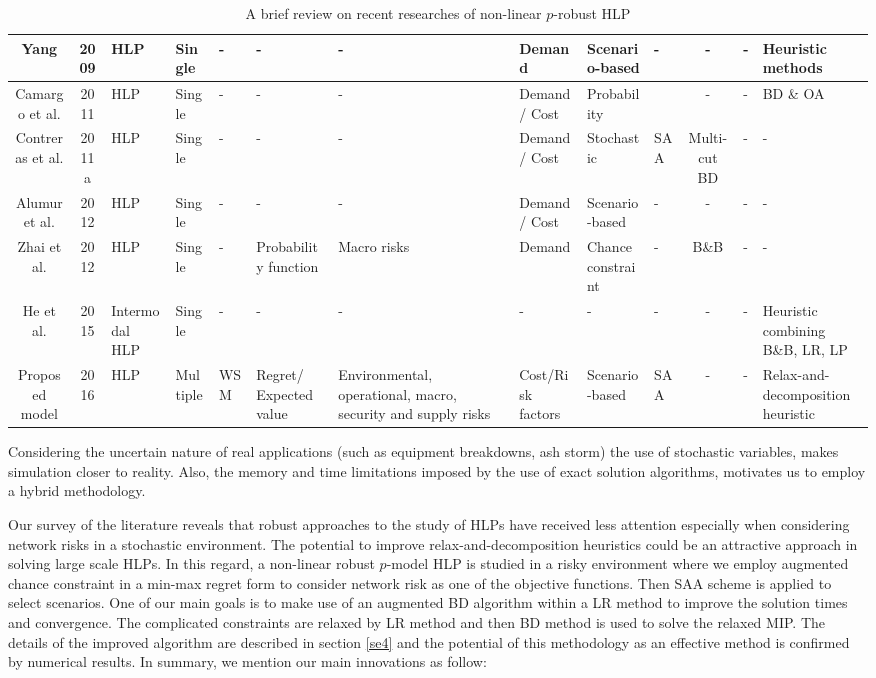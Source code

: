 \documentclass[review]{elsarticle}
\begin{document}
\begin{sidewaystable}
{\begin{tabular}{ccp{3cm}p{2cm}p{2cm}p{2cm}p{3cm}p{3cm}p{2cm}p{2cm}cp{2cm}p{2cm}}
Yang & 2009 & HLP & Single & - & - & - & Demand & Scenario-based & - & - & - & Heuristic methods \\ \hline 
Camargo et al. & 2011 & HLP & Single & - & - & - & Demand/ Cost & Probability &  & - & - & BD \& OA \\ \hline 
Contreras et al. & 2011a & HLP & Single & - & - & - & Demand/ Cost & Stochastic & SAA & Multi-cut BD & - & - \\ \hline 
Alumur et al. & 2012 & HLP & Single & - & - & - & Demand/ Cost & Scenario-based & - & - & - & - \\ \hline 
Zhai et al. & 2012 & HLP & Single & - & Probability function & Macro risks & Demand & Chance constraint & - & B\&B & - & - \\ \hline 
He et al. & 2015 & Intermodal HLP & Single & - & - & - & - & - & - & - & - & Heuristic combining B\&B, LR, LP \\ \hline 
Proposed model & 2016 & HLP & Multiple & WSM & Regret/ Expected value & Environmental, operational, macro, security and supply risks & Cost/Risk factors & Scenario-based & SAA & - & - & Relax-and-decomposition heuristic \\ \hline 
\end{tabular}}
\caption{A brief review on recent researches of non-linear $p$-robust HLP}\label{ta1}
\end{sidewaystable}

Considering the uncertain nature of real applications (such as equipment breakdowns, ash storm) the use of stochastic variables, makes simulation closer to reality. Also, the memory and time limitations imposed by the use of exact solution algorithms, motivates us to employ a hybrid methodology.

Our survey of the literature reveals that robust approaches to the study of HLPs have received less attention especially when considering network risks in a stochastic environment. The potential to improve relax-and-decomposition heuristics could be an attractive approach in solving large scale HLPs. In this regard, a non-linear robust $p$-model HLP is studied in a risky environment where we employ augmented chance constraint in a min-max regret form to consider network risk as one of the objective functions. Then SAA scheme is applied to select scenarios. One of our main goals is to make use of an augmented BD algorithm within a LR method to improve the solution times and convergence. The complicated constraints are relaxed by LR method and then BD method is used to solve the relaxed MIP. The details of the improved algorithm are described in section \ref{se4} and the potential of this methodology as an effective method is confirmed by numerical results. In summary, we mention our main innovations as follow:
\end{document}
